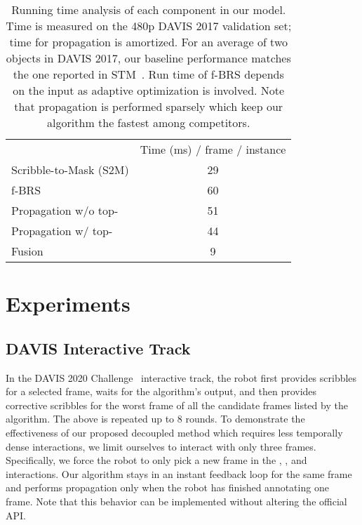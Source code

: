 \documentclass[final]{cvpr}
\begin{document}
	\begin{table}[h]	
		\begin{center}
			\small
			\begin{tabular}{l|c}
				\hline
				& Time (ms) / frame / instance\\
				\Xhline{3\arrayrulewidth}
				Scribble-to-Mask (S2M) & 29 \\
				\hline
				f-BRS~\cite{sofiiuk2020fbrs} & 60 \\
				\hline
				Propagation w/o top- & 51 \\
				\hline
				Propagation w/ top- & 44 \\
				\hline
				Fusion & 9 \\
				\hline
			\end{tabular}
		\end{center}
		\vspace{-0.15in}
		\caption{Running time analysis of each component in our model. Time is measured on the 480p DAVIS 2017 validation set; time for propagation is amortized. 
		For an average of two objects in DAVIS 2017, our baseline performance matches the one reported in STM~\cite{oh2020STMPAMI}. 
		Run time of f-BRS depends on the input as adaptive optimization is involved.
		Note that propagation is performed sparsely which keep our algorithm the fastest among competitors.}
		\label{tab:run_time}
\end{table}
	
	\vspace{-2mm}
	\section{Experiments}\label{expr}
	
	\subsection{DAVIS Interactive Track}
	In the DAVIS 2020 Challenge~\cite{Caelles_arXiv_2019} interactive track, the robot first provides scribbles for a selected frame, waits for the algorithm's output, and then provides corrective scribbles for the worst frame of all the candidate frames listed by the algorithm. The above is repeated up to 8 rounds. 
To demonstrate the effectiveness of our proposed decoupled method which requires less temporally dense interactions, we limit ourselves to interact with only three frames. Specifically, we force the robot to only pick a new frame in the , , and  interactions. Our algorithm stays in an instant feedback loop for the same frame and performs propagation only when the robot has finished annotating one frame. Note that this behavior can be implemented without altering the official API.
	
\end{document}
